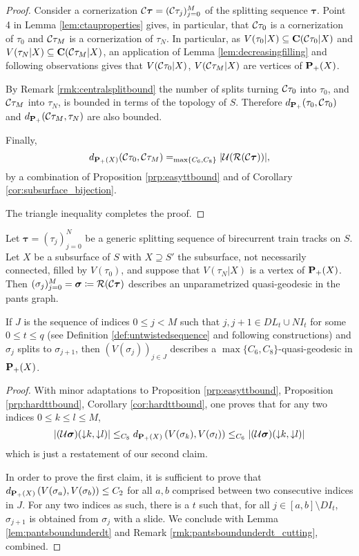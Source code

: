 \begin{proof}
Consider a cornerization ${\mathcal C}\bm\tau=({\mathcal C}\tau_j)_{j=0}^M$ of the splitting sequence $\bm\tau$. Point 4 in Lemma \ref{lem:ctauproperties} gives, in particular, that ${\mathcal C}\tau_0$ is a cornerization of $\tau_0$ and ${\mathcal C}\tau_M$ is a cornerization of $\tau_N$. In particular, as $V(\tau_0|X)\subseteq \mathbf C({\mathcal C}\tau_0|X)$ and $V(\tau_N|X)\subseteq \mathbf C({\mathcal C}\tau_M|X)$, an application of Lemma \ref{lem:decreasingfilling} and following observations gives that $V({\mathcal C}\tau_0|X)$, $V({\mathcal C}\tau_M|X)$ are vertices of ${\mathbf{P}_+}(X)$.

By Remark \ref{rmk:centralsplitbound} the number of splits turning ${\mathcal C}\tau_0$ into $\tau_0$, and ${\mathcal C}\tau_M$ into $\tau_N$, is bounded in terms of the topology of $S$. Therefore $d_{\mathbf{P}_+}(\tau_0,{\mathcal C}\tau_0)$ and $d_{\mathbf{P}_+}({\mathcal C}\tau_M,\tau_N)$ are also bounded.

Finally,
$$
d_{{\mathbf{P}_+}(X)}({\mathcal C}\tau_0,{\mathcal C}\tau_M)=_{\max\{C_6,C_8\}} |{\mathcal U}({\mathcal R}({\mathcal C}\bm\tau))|,
$$
by a combination of Proposition \ref{prp:easyttbound} and of Corollary \ref{cor:subsurface_bijection}.

The triangle inequality completes the proof.
\end{proof}

\begin{coroll}
Let $\bm\tau=(\tau_j)_{j=0}^N$ be a generic splitting sequence of birecurrent train tracks on $S$. Let $X$ be a subsurface of $S$ with $X\supseteq S'$ the subsurface, not necessarily connected, filled by $V(\tau_0)$, and suppose that $V(\tau_N|X)$ is a vertex of ${\mathbf{P}_+}(X)$. Then $(\sigma_j)_{j=0}^M=\bm\sigma\coloneqq {\mathcal R}({\mathcal C}\bm\tau)$ describes an unparametrized quasi-geodesic in the pants graph.

If $J$ is the sequence of indices $0\leq j< M$ such that $j,j+1 \in DL_t\cup NI_t$ for some $0\leq t \leq q$ (see Definition \ref{def:untwistedsequence} and following constructions) and $\sigma_j$ splits to $\sigma_{j+1}$, then $\left(V(\sigma_j)\right)_{j\in J}$ describes a $\max\{C_6,C_8\}$-quasi-geodesic in ${\mathbf{P}_+}(X)$.
\end{coroll}
\begin{proof}
With minor adaptations to Proposition \ref{prp:easyttbound}, Proposition \ref{prp:hardttbound}, Corollary \ref{cor:hardttbound}, one proves that for any two indices $0\leq k\leq l\leq M$,
$$
|({\mathcal U}\bm\sigma)(\mathord{\downarrow} k,\mathord{\downarrow} l)|\leq_{C_8} d_{{\mathbf{P}_+}(X)}\left(V(\sigma_k),V(\sigma_l)\right)\leq_{C_6} |({\mathcal U}\bm\sigma)(\mathord{\downarrow} k,\mathord{\downarrow} l)|
$$
which is just a restatement of our second claim.

In order to prove the first claim, it is sufficient to prove that\linebreak $d_{{\mathbf{P}_+}(X)}\left(V(\sigma_a),V(\sigma_b)\right)\leq C_2$ for all $a,b$ comprised between two consecutive indices in $J$. For any two indices as such, there is a $t$ such that, for all $j\in [a,b]\setminus DI_t$, $\sigma_{j+1}$ is obtained from $\sigma_j$ with a slide. We conclude with Lemma \ref{lem:pantsboundunderdt} and Remark \ref{rmk:pantsboundunderdt_cutting}, combined.
\end{proof}